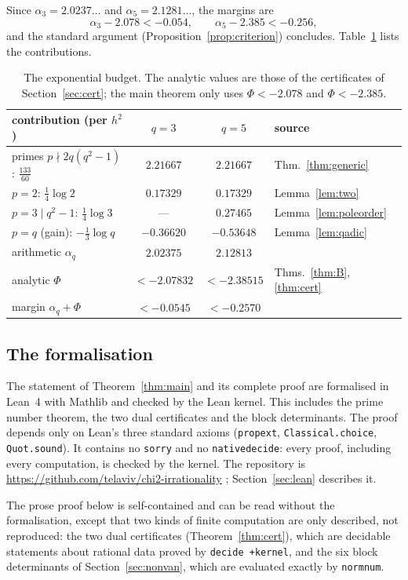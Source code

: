 \documentclass[11pt]{amsart}
\theoremstyle{definition}
\theoremstyle{remark}
\numberwithin{equation}{section}
\newcommand{\lean}[1]{{\def\_{\textunderscore\allowbreak}\texttt{#1}}}
\begin{document}
Since $\alpha_3=2.0237\ldots$ and $\alpha_5=2.1281\ldots$, the margins are
\[
  \alpha_3-2.078<-0.054,\qquad \alpha_5-2.385<-0.256,
\]
and the standard argument (Proposition~\ref{prop:criterion}) concludes. Table~\ref{tab:budget} lists the
contributions.

\begin{table}[ht]
\centering
\begin{tabular}{@{}lccl@{}}
\toprule
contribution (per $h^2$) & $q=3$ & $q=5$ & source\\
\midrule
primes $p\nmid2q(q^2-1)$: $\frac{133}{60}$ & $2.21667$ & $2.21667$ & Thm.~\ref{thm:generic}\\
$p=2$: $\frac14\log2$ & $0.17329$ & $0.17329$ & Lemma~\ref{lem:two}\\
$p=3\mid q^2-1$: $\frac14\log3$ & --- & $0.27465$ & Lemma~\ref{lem:poleorder}\\
$p=q$ (gain): $-\frac13\log q$ & $-0.36620$ & $-0.53648$ & Lemma~\ref{lem:qadic}\\
\midrule
arithmetic $\alpha_q$ & $2.02375$ & $2.12813$ & \\
analytic $\Phi$ & $<-2.07832$ & $<-2.38515$ & Thms.~\ref{thm:B}, \ref{thm:cert}\\
\midrule
margin $\alpha_q+\Phi$ & $<-0.0545$ & $<-0.2570$ & \\
\bottomrule
\end{tabular}
\caption{The exponential budget. The analytic values are those of the certificates of
Section~\ref{sec:cert}; the main theorem only uses $\Phi<-2.078$ and $\Phi<-2.385$.}\label{tab:budget}
\end{table}

\subsection{The formalisation}
The statement of Theorem~\ref{thm:main} and its complete proof are formalised in Lean~4 \cite{LeanFour} with
Mathlib \cite{Mathlib} and checked by the Lean kernel. This includes the prime number theorem, the two dual
certificates and the block determinants. The proof depends only on Lean's three standard axioms
(\lean{propext}, \lean{Classical.choice}, \lean{Quot.sound}). It contains no \lean{sorry} and no
\lean{native\_decide}: every proof, including every computation, is checked by the kernel. The repository is
\url{https://github.com/telaviv/chi2-irrationality} \cite{Chi2Repo}; Section~\ref{sec:lean} describes it.

The prose proof below is self-contained and can be read without the formalisation, except that two
kinds of finite computation are only described, not reproduced: the two dual certificates (Theorem~\ref{thm:cert}),
which are decidable statements about rational data proved by \lean{decide +kernel}, and the six block
determinants of Section~\ref{sec:nonvan}, which are evaluated exactly by \lean{norm\_num}.
\end{document}

